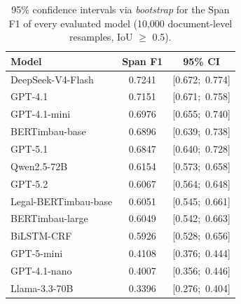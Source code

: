 \begin{table}[ht]
    \centering
    \caption{95\% confidence intervals via \textit{bootstrap} for the Span F1 of every evaluated model (10,000 document-level resamples, IoU $\geq$ 0.5).}
    \label{tab:bootstrap_ic}
    \small
    \begin{tabular}{lcc}
        \hline
        \textbf{Model} & \textbf{Span F1} & \textbf{95\% CI} \\
        \hline
        DeepSeek-V4-Flash                   & 0.7241 & [0.672;\ 0.774] \\
        GPT-4.1                             & 0.7151 & [0.671;\ 0.758] \\
        GPT-4.1-mini                        & 0.6976 & [0.655;\ 0.740] \\
        BERTimbau-base                      & 0.6896 & [0.639;\ 0.738] \\
        GPT-5.1                             & 0.6847 & [0.640;\ 0.728] \\
        Qwen2.5-72B                         & 0.6154 & [0.573;\ 0.658] \\
        GPT-5.2                             & 0.6067 & [0.564;\ 0.648] \\
        Legal-BERTimbau-base                & 0.6051 & [0.545;\ 0.661] \\
        BERTimbau-large                     & 0.6049 & [0.542;\ 0.663] \\
        BiLSTM-CRF                          & 0.5926 & [0.528;\ 0.656] \\
        GPT-5-mini                          & 0.4108 & [0.376;\ 0.444] \\
        GPT-4.1-nano                        & 0.4007 & [0.356;\ 0.446] \\
        Llama-3.3-70B                       & 0.3396 & [0.276;\ 0.404] \\
        \hline
    \end{tabular}
\end{table}
